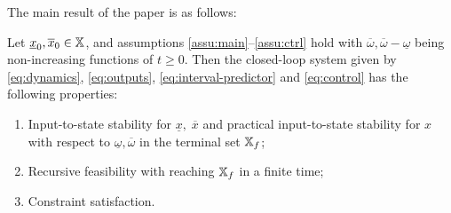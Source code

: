 The main result of the paper is as follows:
\begin{theorem}
	\begin{leftbar}[theorembar]
	\label{th:MPC} Let $\underline{x}_{0},\overline{x}_{0}\in\mathbb{X}$, and
	assumptions \ref{assu:main}--\ref{assu:ctrl} hold with $\overline{\omega},\overline{\omega}-\underline{\omega}$
	being non-increasing functions of $t\geq0$. Then the closed-loop
	system given by \eqref{eq:dynamics}, \eqref{eq:outputs}, \eqref{eq:interval-predictor}
	and \eqref{eq:control} has the following properties:
	\begin{enumerate}
		\item Input-to-state stability for $\underline{x},\;\overline{x}$ and practical
		input-to-state stability for $x$ with respect to $\underline{\omega},\overline{\omega}$
		in the terminal set $\mathbb{X}_{f}$; 
		\item Recursive feasibility with reaching $\mathbb{X}_{f}$ in a finite time; 
		\item Constraint satisfaction.
	\end{enumerate}
\end{leftbar}
\end{theorem}
